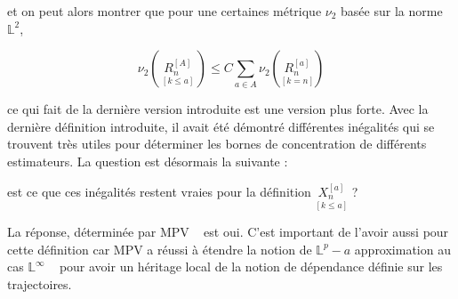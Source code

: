 \noindent et on peut alors montrer que pour une certaines métrique $\nu_2$ basée sur la norme $\mathds L^2$,

$$\nu_2\left( \,\underset {[k\leq a]} {R_n^{[A]}} \, \right) \leq C \sum\limits_{a \in A} \nu_2 \left( \underset {[k = n]} {R_n^{[a]}} \right)$$

\noindent ce qui fait de la dernière version introduite est une version plus forte. Avec la dernière définition introduite, il avait été démontré différentes inégalités qui se trouvent très utiles pour déterminer les bornes de concentration de différents estimateurs. La question est désormais la suivante :

\begin{center}
	{\og est ce que ces inégalités restent vraies pour la définition $\underset {[k\leq a]} {X_n^{[a]}}$ ? \fg}
\end{center}

La réponse, déterminée par MPV ~\cite{maissoro-SmoothnessFTSweakDep} est {oui}. C'est important de l'avoir aussi pour cette définition car MPV a réussi à étendre la notion de $\mathds L^p-a$ approximation au cas $\mathds L^\infty$ ~\cite{maissoro-SmoothnessFTSweakDep}  pour avoir un héritage local de la notion de dépendance définie sur les trajectoires.
